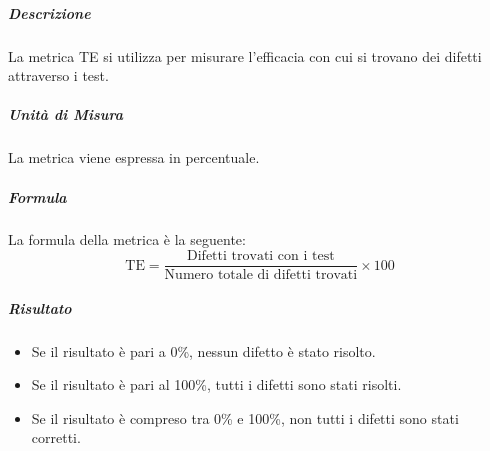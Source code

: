 			\subparagraph{Descrizione}
			La metrica TE si utilizza per misurare l'efficacia con cui si trovano dei difetti attraverso i test.

			\subparagraph{Unità di Misura}
			La metrica viene espressa in percentuale.

			\subparagraph{Formula}
			La formula della metrica è la seguente:
			\[
				\text{TE} = \frac{\text{Difetti trovati con i test}}{\text{Numero totale di difetti trovati}} \times 100
			\]

			\subparagraph{Risultato}
			\begin{itemize}
				\item Se il risultato è pari a 0\%, nessun difetto è stato risolto.
				\item Se il risultato è pari al 100\%, tutti i difetti sono stati risolti.
				\item Se il risultato è compreso tra 0\% e 100\%, non tutti i difetti sono stati corretti.
			\end{itemize}


